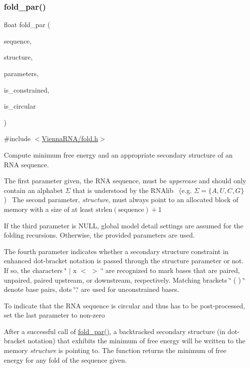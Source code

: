 \subsubsection{\texorpdfstring{fold\+\_\+par()}{fold\_par()}}
{\footnotesize\ttfamily float fold\+\_\+par (\begin{DoxyParamCaption}\item[{const char $\ast$}]{sequence,  }\item[{char $\ast$}]{structure,  }\item[{\mbox{\hyperlink{group__energy__parameters_ga8a69ca7d787e4fd6079914f5343a1f35}{vrna\+\_\+param\+\_\+t}} $\ast$}]{parameters,  }\item[{int}]{is\+\_\+constrained,  }\item[{int}]{is\+\_\+circular }\end{DoxyParamCaption})}



{\ttfamily \#include $<$\mbox{\hyperlink{fold_8h}{Vienna\+R\+N\+A/fold.\+h}}$>$}



Compute minimum free energy and an appropriate secondary structure of an R\+NA sequence. 

The first parameter given, the R\+NA sequence, must be {\itshape uppercase} and should only contain an alphabet $\Sigma$ that is understood by the R\+N\+Alib~\newline
(e.\+g. $ \Sigma = \{A,U,C,G\} $)~\newline
 The second parameter, {\itshape structure}, must always point to an allocated block of memory with a size of at least $\mathrm{strlen}(\mathrm{sequence})+1$

If the third parameter is N\+U\+LL, global model detail settings are assumed for the folding recursions. Otherwise, the provided parameters are used.

The fourth parameter indicates whether a secondary structure constraint in enhanced dot-\/bracket notation is passed through the structure parameter or not. If so, the characters \char`\"{} $\vert$ x $<$ $>$ \char`\"{} are recognized to mark bases that are paired, unpaired, paired upstream, or downstream, respectively. Matching brackets \char`\"{} ( ) \char`\"{} denote base pairs, dots \char`\"{}.\char`\"{} are used for unconstrained bases.

To indicate that the R\+NA sequence is circular and thus has to be post-\/processed, set the last parameter to non-\/zero

After a successful call of \mbox{\hyperlink{group__mfe__fold__single_ga2bc41df5d71fee6fd8da9904ee65d8fb}{fold\+\_\+par()}}, a backtracked secondary structure (in dot-\/bracket notation) that exhibits the minimum of free energy will be written to the memory {\itshape structure} is pointing to. The function returns the minimum of free energy for any fold of the sequence given.

